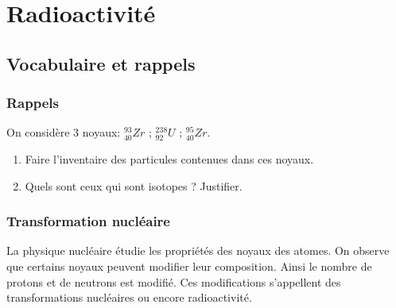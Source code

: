 \setcounter{chapter}{12}
\chapter{Radioactivité}

\section{Vocabulaire et rappels}
\subsection{Rappels}


 On considère 3 noyaux: $_{40}^{93}Zr$ ; $_{92}^{238}U$ ; $_{40}^{95}Zr$. 
\begin{enumerate}
	\item Faire l'inventaire des particules contenues dans ces noyaux.
	\item Quels sont ceux qui sont isotopes ? Justifier.
\end{enumerate}

\vspace{4cm}

\subsection{Transformation nucléaire}

La physique nucléaire étudie les propriétés des noyaux des atomes. On observe que certains noyaux peuvent modifier leur composition. Ainsi le nombre de protons et de neutrons est modifié. Ces modifications s'appellent des transformations nucléaires ou encore radioactivité.


